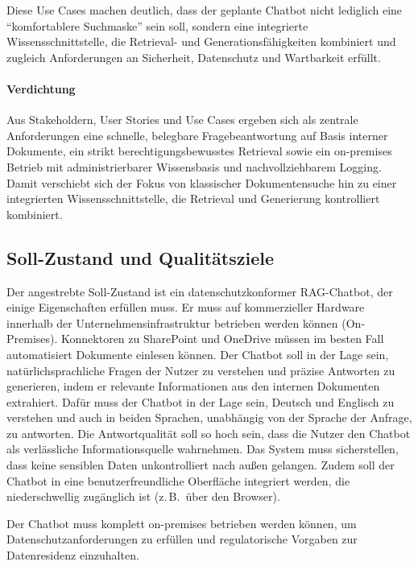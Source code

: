 \vspace{1cm}
\FloatBarrier
Diese Use Cases machen deutlich, dass der geplante Chatbot nicht lediglich eine \enquote{komfortablere Suchmaske} sein soll, sondern eine integrierte Wissensschnittstelle, die Retrieval- und Generationsfähigkeiten kombiniert und zugleich Anforderungen an Sicherheit, Datenschutz und Wartbarkeit erfüllt.
\paragraph{Verdichtung}
Aus Stakeholdern, User Stories und Use Cases ergeben sich als zentrale Anforderungen eine schnelle, belegbare Fragebeantwortung auf Basis interner Dokumente, ein strikt berechtigungsbewusstes Retrieval sowie ein on-premises Betrieb mit administrierbarer Wissensbasis und nachvollziehbarem Logging.
Damit verschiebt sich der Fokus von klassischer Dokumentensuche hin zu einer integrierten Wissensschnittstelle, die Retrieval und Generierung kontrolliert kombiniert.


\subsection{Soll-Zustand und Qualitätsziele}\label{subsec:soll-zustand}

Der angestrebte Soll-Zustand ist ein datenschutzkonformer RAG-Chatbot, der einige Eigenschaften erfüllen muss.
Er muss auf kommerzieller Hardware innerhalb der Unternehmensinfrastruktur betrieben werden können (On-Premises).
Konnektoren zu SharePoint und OneDrive müssen im besten Fall automatisiert Dokumente einlesen können.
Der Chatbot soll in der Lage sein, natürlichsprachliche Fragen der Nutzer zu verstehen und präzise Antworten zu generieren, indem er relevante Informationen aus den internen Dokumenten extrahiert.
Dafür muss der Chatbot in der Lage sein, Deutsch und Englisch zu verstehen und auch in beiden Sprachen, unabhängig von der Sprache der Anfrage, zu antworten.
Die Antwortqualität soll so hoch sein, dass die Nutzer den Chatbot als verlässliche Informationsquelle wahrnehmen.
Das System muss sicherstellen, dass keine sensiblen Daten unkontrolliert nach außen gelangen.
Zudem soll der Chatbot in eine benutzerfreundliche Oberfläche integriert werden, die niederschwellig zugänglich ist (z.\,B.\ über den Browser).

Der Chatbot muss komplett on-premises betrieben werden können, um Datenschutzanforderungen zu erfüllen und regulatorische Vorgaben zur Datenresidenz einzuhalten.

